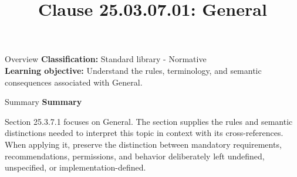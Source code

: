 \documentclass[10pt,letterpaper]{article}
\title{Clause 25.03.07.01: General}
\author{}
\date{}
\begin{document}
\maketitle
\begin{CornellOverviewBox}{Overview}
\textbf{Classification:} Standard library - Normative\\[2pt]
\textbf{Learning objective:} Understand the rules, terminology, and semantic consequences associated with General.
\end{CornellOverviewBox}\begin{CornellSummaryBox}{Summary}
{\sffamily\bfseries\color{Accent} Summary}\par\vspace{3pt}Section 25.3.7.1 focuses on General. The section supplies the rules and semantic distinctions needed to interpret this topic in context with its cross-references. When applying it, preserve the distinction between mandatory requirements, recommendations, permissions, and behavior deliberately left undefined, unspecified, or implementation-defined.
\end{CornellSummaryBox}
\end{document}
